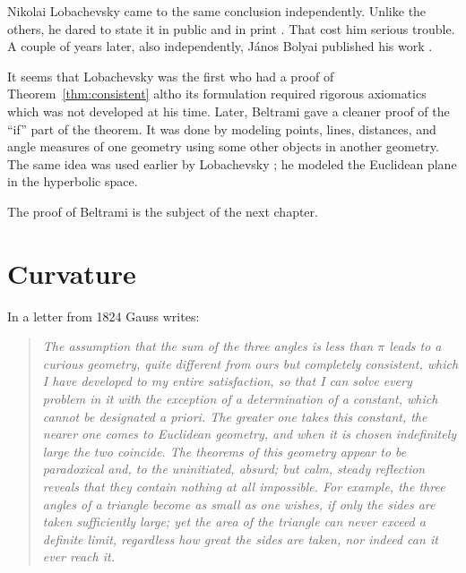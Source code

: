 \smallskip

Nikolai Lobachevsky came to the same conclusion independently.
Unlike the others, he dared to state it in public and in print \cite{lobachevsky}.
That cost him serious trouble.
A couple of years later, also independently, János Bolyai published his work \cite{bolyai}.

It seems that Lobachevsky was the first who had a proof of Theorem~\ref{thm:consistent} altho its formulation required rigorous axiomatics which was not developed at his time.
Later, Beltrami gave a cleaner proof of the ``if'' part of the theorem.
It was done by modeling points, lines, distances, and angle measures of one geometry using some other objects in another geometry.
The same idea was used earlier by Lobachevsky \cite[\S34]{lobachevsky-1840}; 
he modeled the Euclidean plane in the hyperbolic space.

The proof of Beltrami is the subject of the next chapter. 



\section{Curvature}

In a letter from 1824 Gauss writes: 

\begin{quotation}{\it
The assumption that the sum of the three angles is less than $\pi$ leads to a curious geometry, 
quite different from ours but completely consistent, 
which I have developed to my entire satisfaction, 
so that I can solve every problem in it with the exception of a determination of a constant, which cannot be designated a priori. 
The greater one takes this constant, the nearer one comes to Euclidean geometry, 
and when it is chosen indefinitely large the two coincide.
The theorems of this geometry appear to be paradoxical and, 
to the uninitiated, absurd; but calm, steady reflection reveals that they contain nothing at all impossible. 
For example, the three angles of a triangle become as small as one wishes, if only the sides are taken sufficiently large; 
yet the area of the triangle can never exceed a definite limit, regardless how great the sides are taken, 
nor indeed can it ever reach it.}
\end{quotation} 

